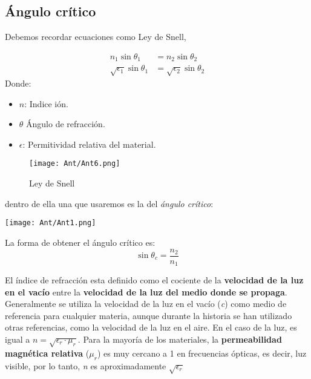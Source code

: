 \documentclass[
	12pt, %
	fleqn, %
	a4paper, %
	oneside, %
]{LegrandOrangeBook}
\begin{document}
\subsection{Ángulo crítico}
Debemos recordar ecuaciones como Ley de Snell,
\begin{definition}
\begin{align}
n_1\sin\theta_1&=n_2\sin\theta_2\\
\sqrt{\epsilon_1}\sin\theta_1&=\sqrt{\epsilon_2}\sin\theta_2
\label{eq:snell}
\end{align}
Donde:
\begin{itemize}
\item $n$: Indice ión.
\item $\theta$ Ángulo de refracción.
\item $\epsilon$: Permitividad relativa del material.
\end{itemize}
\end{definition}
\begin{figure}[H]
\centering
\texttt{[image: Ant/Ant6.png]}
\caption{Ley de Snell}
\end{figure}
dentro de ella una que usaremos es la del \textit{ángulo crítico}:
\begin{center}
\texttt{[image: Ant/Ant1.png]}
\end{center}
La forma de obtener el ángulo crítico es:
\begin{equation}
\sin\theta_c=\frac{n_2}{n_1}
\label{eq: angulo critico}
\end{equation}
\begin{notation}
El índice de refracción esta definido como el cociente de la \textbf{velocidad de la luz en el vacío} entre la \textbf{velocidad de la luz del medio donde se propaga}. Generalmente se utiliza la velocidad de la luz en el vacío (\textit{c}) como medio de referencia para cualquier materia, aunque durante la historia se han utilizado otras referencias, como la velocidad de la luz en el aire. En el caso de la luz, es igual a $n=\sqrt{\epsilon_r\cdot\mu_r}$. Para la mayoría de los materiales, la \textbf{permeabilidad magnética relativa} ($\mu_r$) es muy cercano a 1 en frecuencias ópticas, es decir, luz visible, por lo tanto, \textit{n} es aproximadamente $\sqrt{\epsilon_r}$
\end{notation}
\end{document}
